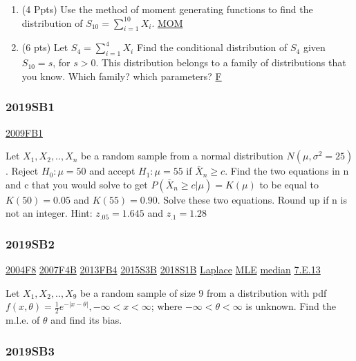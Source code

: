 \documentclass[10pt,twocolumn,portrait]{article}
\begin{document}
\begin{enumerate}
\def\labelenumi{(\alph{enumi})}
\item
  (4 Ppts) Use the method of moment generating functions to find the
  distribution of \(S_{10}=\sum^{10}_{i=1} X_i\).
  \protect\hyperlink{section-2}{MOM}
\item
  (6 pts) Let \(S_4=\sum_{i=1}^4X_i\) Find the conditional distribution
  of \(S_4\) given \(S_{10}=s\), for \(s>0\). This distribution belongs
  to a family of distributions that you know. Which family? which
  parameters? \protect\hyperlink{F}{F}
\end{enumerate}

\hypertarget{sb1-3}{%
\subsubsection{2019SB1}\label{sb1-3}}

\protect\hyperlink{fb1}{2009FB1}

Let \(X_1,X_2,..,X_n\) be a random sample from a normal distribution
\(N(\mu,\sigma^2=25)\). Reject \(H_0:\mu=50\) and accept \(H_1:\mu=55\)
if \(\bar X_n\ge c\). Find the two equations in n and c that you would
solve to get \(P(\bar X_n\ge c|\mu)=K(\mu)\) to be equal to
\(K(50)=0.05\) and \(K(55)=0.90\). Solve these two equations. Round up
if n is not an integer. Hint: \(z_{.05}=1.645\) and \(z_{.1}=1.28\)

\hypertarget{sb2-3}{%
\subsubsection{2019SB2}\label{sb2-3}}

\protect\hyperlink{f8-2}{2004F8} \protect\hyperlink{f4b}{2007F4B}
\protect\hyperlink{fb4-2}{2013FB4} \protect\hyperlink{s3b-1}{2015S3B}
\protect\hyperlink{s1b-2}{2018S1B} \protect\hyperlink{Laplace}{Laplace}
\protect\hyperlink{MLE}{MLE} \protect\hyperlink{median}{median}
\protect\hyperlink{e.13}{7.E.13}

Let \(X_1,X_2,..,X_9\) be a random sample of size 9 from a distribution
with pdf \(f(x,\theta) =\frac12e^{-|x-\theta|}, -\infty<x<\infty\);
where \(-\infty<\theta<\infty\) is unknown. Find the m.l.e. of
\(\theta\) and find its bias.

\hypertarget{sb3-3}{%
\subsubsection{2019SB3}\label{sb3-3}}
\end{document}
